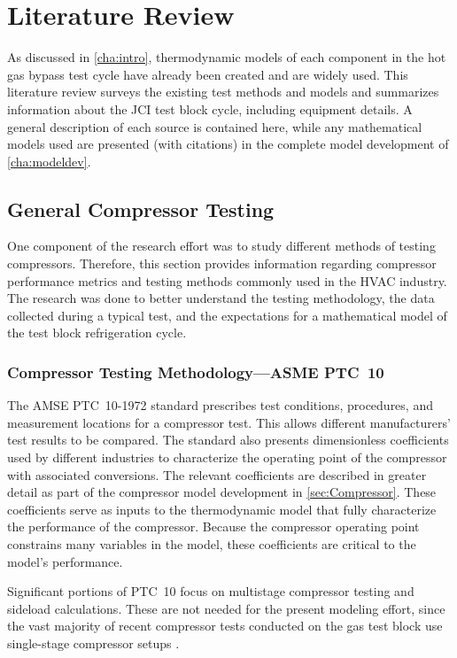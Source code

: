 \chapter{Literature Review} \label{cha:litreview}
As discussed in \cref{cha:intro}, thermodynamic models of each component
in the hot gas bypass test cycle have already been created and are widely used.
This literature review surveys the existing test methods and models 
and summarizes information about the JCI
test block cycle, including equipment details. A general description of each
source is contained here, while any mathematical models used are presented
(with citations) in the complete model development of \cref{cha:modeldev}.

\section{General Compressor Testing} \label{sec:gencomp}
One component of the research effort was 
to study different methods of testing compressors. 
Therefore, this section provides information regarding compressor performance metrics 
and testing methods commonly used in the HVAC%
industry. 
The research was done to better understand the testing methodology, 
the data collected during a typical test, 
and the expectations for a mathematical model of the test block refrigeration cycle.

\subsection{Compressor Testing Methodology---ASME PTC~10} \label{sec:TestMethodology}
The AMSE PTC~10-1972 standard \parencite{ptc10} prescribes test conditions, 
procedures, and measurement locations for a compressor test. 
This allows different manufacturers' test results to be compared. 
The standard also presents dimensionless coefficients used by different 
industries to characterize the operating point of the compressor
with associated conversions. 
The relevant coefficients are described in greater detail as part of the 
compressor model development in \cref{sec:Compressor}.
These coefficients serve as inputs to the thermodynamic model
that fully characterize the performance of the compressor.
Because the compressor operating point constrains
many variables in the model, these coefficients 
are critical to the model's performance.

Significant portions of PTC~10 focus on multistage compressor testing
and sideload calculations. These are not needed for the present
modeling effort, since the vast majority of recent compressor tests
conducted on the  gas test block use 
single-stage compressor setups \parencite{trevino2012}.

